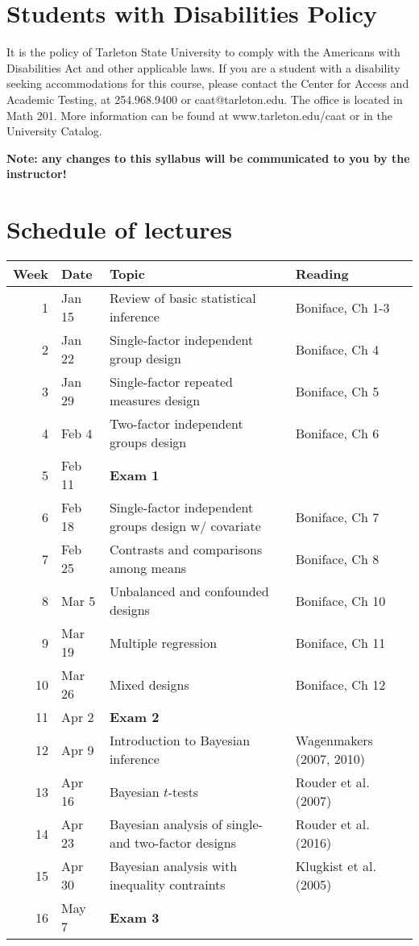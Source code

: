 \documentclass[10pt]{article}
\begin{document}
\section*{Students with Disabilities Policy}
\label{sec:org23785fd}

It is the policy of Tarleton State University to comply with the Americans with Disabilities Act and other applicable laws. If you are a student with a disability seeking accommodations for this course, please contact the Center for Access and Academic Testing, at 254.968.9400 or caat@tarleton.edu. The office is located in Math 201. More information can be found at www.tarleton.edu/caat or in the University Catalog.

\textbf{\textbf{Note:  any changes to this syllabus will be communicated to you by the instructor!}}

\section*{Schedule of lectures}
\label{sec:orgae6ca7d}

\begin{center}
\begin{tabular}{rlll}
Week & Date & Topic & Reading\\
\hline
1 & Jan 15 & Review of basic statistical inference & Boniface, Ch 1-3\\
2 & Jan 22 & Single-factor independent group design & Boniface, Ch 4\\
3 & Jan 29 & Single-factor repeated measures design & Boniface, Ch 5\\
4 & Feb 4 & Two-factor independent groups design & Boniface, Ch 6\\
5 & Feb 11 & \textbf{Exam 1} & \\
6 & Feb 18 & Single-factor independent groups design w/ covariate & Boniface, Ch 7\\
7 & Feb 25 & Contrasts and comparisons among means & Boniface, Ch 8\\
8 & Mar 5 & Unbalanced and confounded designs & Boniface, Ch 10\\
9 & Mar 19 & Multiple regression & Boniface, Ch 11\\
10 & Mar 26 & Mixed designs & Boniface, Ch 12\\
11 & Apr 2 & \textbf{Exam 2} & \\
12 & Apr 9 & Introduction to Bayesian inference & Wagenmakers (2007, 2010)\\
13 & Apr 16 & Bayesian \(t\)-tests & Rouder et al. (2007)\\
14 & Apr 23 & Bayesian analysis of single- and two-factor designs & Rouder et al. (2016)\\
15 & Apr 30 & Bayesian analysis with inequality contraints & Klugkist et al. (2005)\\
16 & May 7 & \textbf{Exam 3} & \\
\end{tabular}
\end{center}
\end{document}
